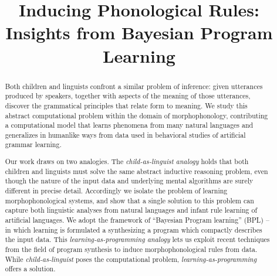 \documentclass{article}
\title{Inducing Phonological Rules: Insights from Bayesian Program Learning}
\begin{document}
\maketitle

\begin{abstract}
Both children and linguists confront a similar problem of inference:
given utterances produced by speakers, together with aspects of the
meaning of those utterances, discover the grammatical principles that
relate form to meaning. We study this abstract computational
problem within the domain of morphophonology, contributing a computational model
that learns phenomena from many natural languages and generalizes in
humanlike ways from data used in behavioral studies of artificial grammar
learning.

Our work draws on two analogies. The \emph{child-as-linguist analogy}
holds that both children and linguists must solve the same abstract
inductive reasoning problem, even though the nature of the input data and underlying mental algorithms
are surely different in precise detail. Accordingly we isolate the
problem of learning morphophonological systems, and show that a single
solution to this problem can capture both linguistic analyses from
natural languages and infant rule learning of artificial languages.
We adopt the framework of ``Bayesian Program learning'' (BPL) -- in
which learning is formulated a synthesizing a program which compactly
describes the input data. This \emph{learning-as-programming analogy}
lets us exploit recent techniques from the field of program synthesis to
induce morphophonological rules from data.
While \emph{child-as-linguist} poses the
computational problem, \emph{learning-as-programming} offers a
solution.
  \end{abstract}
\end{document}
